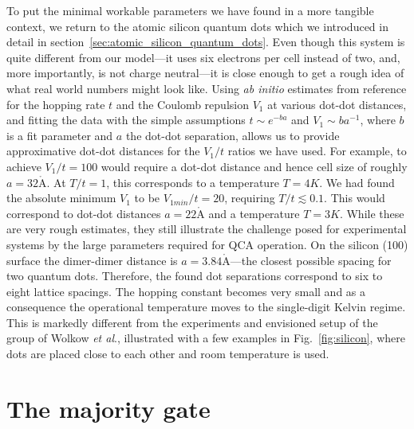To put the minimal workable parameters we have found in a more tangible context,
we return to the atomic silicon quantum dots which we introduced in detail in
section~\ref{sec:atomic_silicon_quantum_dots}. Even though this system is quite
different from our model---it uses six electrons per cell instead of two, and,
more importantly, is not charge neutral---it is close enough to get a rough idea
of what real world numbers might look like. Using \emph{ab initio} estimates
from reference \cite{pitters2011tunnel} for the hopping rate $t$ and the Coulomb
repulsion $V_1$ at various dot-dot distances, and fitting the data with the
simple assumptions $t \sim e^{-b a}$ and $V_1 \sim b a^{-1}$, where $b$ is a fit
parameter and $a$ the dot-dot separation, allows us to provide approximative
dot-dot distances for the $V_1/t$ ratios we have used. For example, to achieve
$V_1/t = 100$ would require a dot-dot distance and hence cell size of roughly $a
= 32 \mathring{\mathrm{A}}$. At $T/t = 1$, this corresponds to a temperature $T
= 4K$. We had found the absolute minimum $V_1$ to be $V_{1min}/t = 20$,
requiring $T/t \lesssim 0.1$. This would correspond to dot-dot distances $a = 22
\mathring{\mathrm{A}}$ and a temperature $T = 3 K$. While these are very rough
estimates, they still illustrate the challenge posed for experimental systems by
the large parameters required for QCA operation. On the silicon (100) surface
the dimer-dimer distance is $a = 3.84 \mathring{\mathrm{A}}$---the closest
possible spacing for two quantum dots. Therefore, the found dot separations
correspond to six to eight lattice spacings. The hopping constant becomes very
small and as a consequence the operational temperature moves to the single-digit
Kelvin regime. This is markedly different from the experiments and envisioned
setup of the group of Wolkow \emph{et al}., illustrated with a few examples in
Fig.~\ref{fig:silicon}, where dots are placed close to each other and room
temperature is used.




\section{The majority gate}

